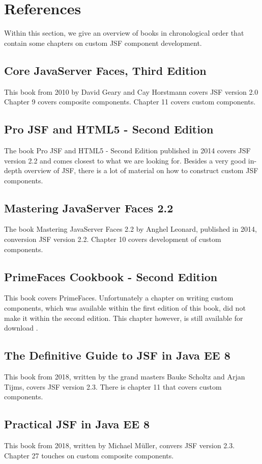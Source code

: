 %

\chapter*{References}
Within this section, we give an overview of books in chronological order that contain some chapters on custom JSF component development.


\section*{Core JavaServer Faces, Third Edition}
This book \cite{geary2010core} from 2010 by David Geary and Cay Horstmann covers JSF version 2.0
Chapter 9 covers composite components.
Chapter 11 covers custom components.


\section*{Pro JSF and HTML5 - Second Edition}
The book Pro JSF and HTML5 - Second Edition \cite{wadia2014pro} published in 2014 covers JSF version 2.2 and comes closest to what we are looking for.
Besides a very good in-depth overview of JSF, there is a lot of material on how to construct custom JSF components.


\section*{Mastering JavaServer Faces 2.2}
The book Mastering JavaServer Faces 2.2 \cite{leonard2014mastering} by Anghel Leonard, published in 2014, conversion JSF version 2.2.
Chapter 10 covers development of custom components.
 
 
 \section*{PrimeFaces Cookbook - Second Edition}
 This book \cite{10.5555/2834507} covers PrimeFaces.
 Unfortunately a chapter on writing custom components, which was available within the first edition of this book, did not make it within the second edition.
 This chapter however, is still available for download \cite{PrimeFacesCookbookChapter11}.


\section*{The Definitive Guide to JSF in Java EE 8}
This book \cite{Scholtz2018TheDG} from 2018, written by the grand masters Bauke Scholtz and Arjan Tijms, covers JSF version 2.3.
There is chapter 11 that covers custom components.


\section*{Practical JSF in Java EE 8}
This book \cite{muller2018practicalJSF} from 2018, written by Michael Müller, convers JSF version 2.3.
Chapter 27 touches on custom composite components.



